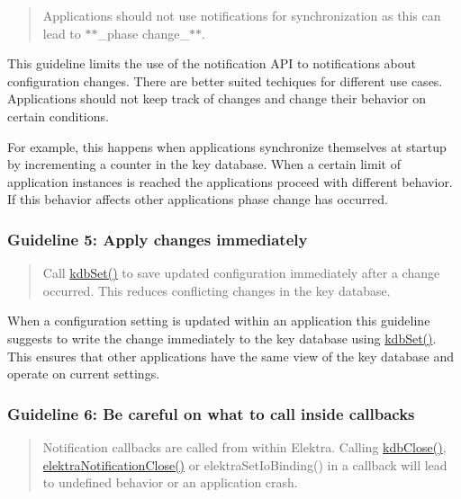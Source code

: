 \begin{quote}
Applications should not use notifications for synchronization as this can lead to $\ast$$\ast$\+\_\+phase change\+\_\+$\ast$$\ast$. \end{quote}


This guideline limits the use of the notification A\+PI to notifications about configuration changes. There are better suited techiques for different use cases. Applications should not keep track of changes and change their behavior on certain conditions.

For example, this happens when applications synchronize themselves at startup by incrementing a counter in the key database. When a certain limit of application instances is reached the applications proceed with different behavior. If this behavior affects other applications phase change has occurred.

\subsubsection*{Guideline 5\+: Apply changes immediately}

\begin{quote}
Call {\ttfamily \hyperlink{group__kdb_ga11436b058408f83d303ca5e996832bcf}{kdb\+Set()}} to save updated configuration immediately after a change occurred. This reduces conflicting changes in the key database. \end{quote}


When a configuration setting is updated within an application this guideline suggests to write the change immediately to the key database using {\ttfamily \hyperlink{group__kdb_ga11436b058408f83d303ca5e996832bcf}{kdb\+Set()}}. This ensures that other applications have the same view of the key database and operate on current settings.

\subsubsection*{Guideline 6\+: Be careful on what to call inside callbacks}

\begin{quote}
Notification callbacks are called from within Elektra. Calling {\ttfamily \hyperlink{group__kdb_gadb54dc9fda17ee07deb9444df745c96f}{kdb\+Close()}}, {\ttfamily \hyperlink{group__kdbnotification_ga5685dafbd4131011365628d6d9213594}{elektra\+Notification\+Close()}} or {\ttfamily elektra\+Set\+Io\+Binding()} in a callback will lead to undefined behavior or an application crash. \end{quote}


